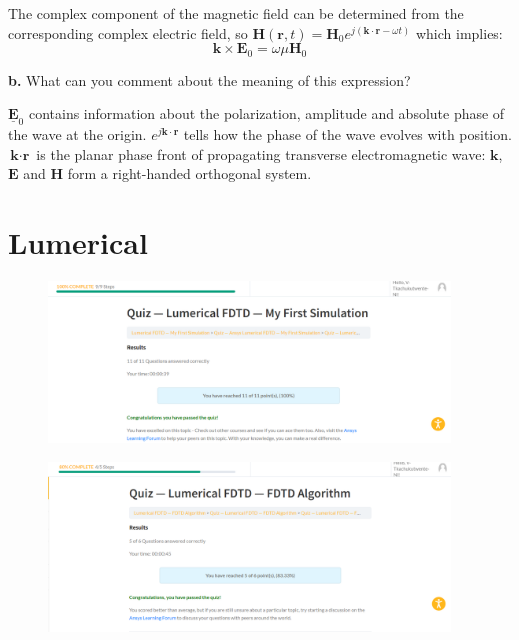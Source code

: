 \documentclass[11pt,a4paper]{article}
\begin{document}
The complex component of the magnetic field can be determined from the corresponding complex electric field, so $\textbf{H}(\textbf{r},t)=\textbf{H}_{0}e^{j(\textbf{k}\cdot\textbf{r}-\omega{}t)}$  which implies:
\begin{equation}
    \textbf{k}\times\textbf{E}_0=\omega\mu\textbf{H}_0
\end{equation}

\begin{displayquote}
    \textbf{b.} What can you comment about the meaning of this expression?
\end{displayquote}

$\underline{\textbf{E}}_0$ contains information about the polarization, amplitude and absolute phase of the wave at the origin. $e^{j\textbf{k}\cdot{\textbf{r}}}$ tells how the phase of the wave evolves with position. $\textbf{k}\cdot\textbf{r}$ is the planar phase front of propagating transverse electromagnetic wave: $\textbf{k}$, $\textbf{E}$ and $\textbf{H}$ form a right-handed orthogonal system. 

\section{Lumerical} 

\begin{figure}[ht]
        \includegraphics[width=0.95\textwidth]{fig1.png}
\end{figure}

\begin{figure}[ht]
        \includegraphics[width=0.95\textwidth]{fig2.png}
\end{figure}
\end{document}
